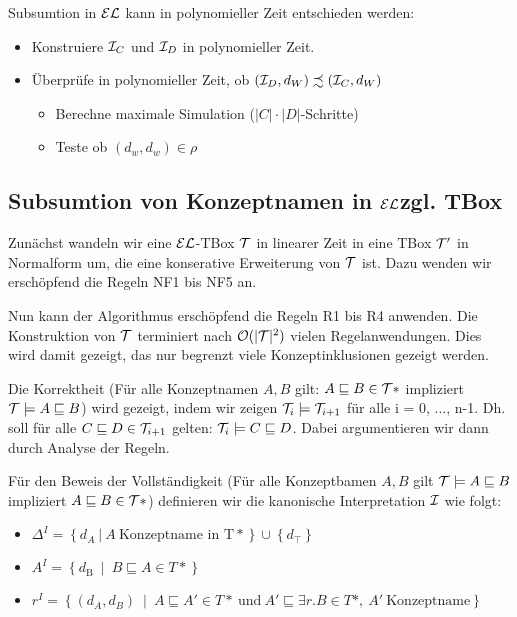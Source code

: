 Subsumtion in $\mathcal{E}\mathcal{L}$ kann in polynomieller Zeit entschieden werden:

\begin{itemize}
	\item Konstruiere $\mathcal{I}_C$ und $\mathcal{I}_D$ in polynomieller Zeit.
	\item Überprüfe in polynomieller Zeit, ob $(\mathcal{I}_D,d_W) \precsim (\mathcal{I}_C,d_W)$
	\begin{itemize}
		\item Berechne maximale Simulation ($|C| \cdot |D|$-Schritte)
		\item Teste ob $(d_w,d_w) \in \rho$
	\end{itemize}
\end{itemize}

\subsection{Subsumtion von Konzeptnamen in \texorpdfstring{$\mathcal{E}\mathcal{L}$} bzgl. TBox}

Zunächst wandeln wir eine $\mathcal{E}\mathcal{L}$-TBox $\mathcal{T}$ in linearer Zeit in eine TBox $\mathcal{T}'$ in Normalform um, die eine konserative Erweiterung von $\mathcal{T}$ ist. Dazu wenden wir erschöpfend die Regeln NF1 bis NF5 an.

Nun kann der Algorithmus erschöpfend die Regeln R1 bis R4 anwenden. Die Konstruktion von $\mathcal{T}$ terminiert nach $\mathcal{O}(|\mathcal{T}|^2)$ vielen Regelanwendungen. Dies wird damit gezeigt, das nur begrenzt viele Konzeptinklusionen gezeigt werden.

Die Korrektheit (Für alle Konzeptnamen $A,B$ gilt: $A \sqsubseteq B \in \mathcal{T}*$ impliziert $\mathcal{T} \models A \sqsubseteq B$) wird gezeigt, indem wir zeigen $\mathcal{T}_i \models \mathcal{T}_{i+1}$ für alle i = 0, ..., n-1. Dh. soll für alle $C \sqsubseteq D \in \mathcal{T}_{i+1}$ gelten: $\mathcal{T}_i \models C \sqsubseteq D$. Dabei argumentieren wir dann durch Analyse der Regeln. 

Für den Beweis der Vollständigkeit (Für alle Konzeptbamen $A,B$ gilt $\mathcal{T} \models A \sqsubseteq B$ impliziert $A \sqsubseteq B \in \mathcal{T} *$) definieren wir die kanonische Interpretation $\mathcal{I}$ wie folgt:

\begin{itemize}
\item
  $\Delta^{I} = \left\{ d_{A}\ |\ A\ \mathrm{\text{Konzeptname\ in\ T}}* \right\} \cup \left\{ d_{\top} \right\}$
\item
  $A^{I} = \left\{ d_{\text{B\ }} \middle| \ B \sqsubseteq A \in T* \right\}$
\item
  $r^{I} = \left\{ \left( d_{A},d_{B} \right)\  \middle| \ A \sqsubseteq A' \in T*\ \mathrm{\text{und}}\ A' \sqsubseteq \exists r.B \in T*,\ A'\ \mathrm{\text{Konzeptname}} \right\}$
\end{itemize}

